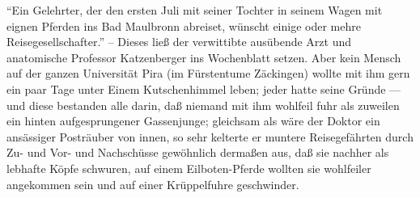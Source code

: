 \documentclass[11pt]{book}
\begin{document}
\beginnumbering
\pstart
``Ein Gelehrter, der den ersten Juli mit seiner Tochter in seinem Wagen mit eignen Pferden ins Bad Maulbronn abreiset, wünscht einige oder mehre Reisegesellschafter.'' -- Dieses ließ der verwittibte ausübende Arzt und anatomische Professor Katzenberger ins Wochenblatt setzen. Aber kein Mensch auf der ganzen Universität Pira (im Fürstentume Zäckingen) wollte mit ihm gern ein paar Tage unter Einem Kutschenhimmel leben; jeder hatte seine Gründe --- und diese bestanden alle darin, daß niemand mit ihm wohlfeil fuhr als zuweilen ein hinten aufgesprungener Gassenjunge; gleichsam als wäre der Doktor ein ansässiger Posträuber von innen, so sehr kelterte er muntere Reisegefährten durch Zu- und Vor- und Nachschüsse gewöhnlich dermaßen aus, daß sie nachher als lebhafte Köpfe schwuren, auf einem Eilboten-Pferde wollten sie wohlfeiler angekommen sein und auf einer Krüppelfuhre geschwinder.
\pend
\endnumbering
\end{document}
